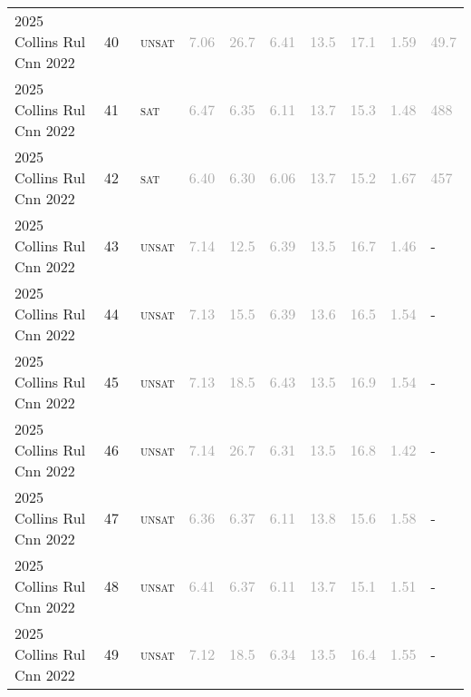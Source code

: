 \begin{center}
{\begin{longtable}{@{}llllllllll@{}}
2025 Collins Rul Cnn 2022 & 40 & ~\textsc{unsat} & \textcolor{darkgray}{7.06} & \textcolor{darkgray}{26.7} & \textcolor{darkgray}{6.41} & \textcolor{darkgray}{13.5} & \textcolor{darkgray}{17.1} & \textcolor{darkgray}{1.59} & \textcolor{darkgray}{49.7} \\
2025 Collins Rul Cnn 2022 & 41 & ~\textsc{sat} & \textcolor{darkgray}{6.47} & \textcolor{darkgray}{6.35} & \textcolor{darkgray}{6.11} & \textcolor{darkgray}{13.7} & \textcolor{darkgray}{15.3} & \textcolor{darkgray}{1.48} & \textcolor{darkgray}{488} \\
2025 Collins Rul Cnn 2022 & 42 & ~\textsc{sat} & \textcolor{darkgray}{6.40} & \textcolor{darkgray}{6.30} & \textcolor{darkgray}{6.06} & \textcolor{darkgray}{13.7} & \textcolor{darkgray}{15.2} & \textcolor{darkgray}{1.67} & \textcolor{darkgray}{457} \\
2025 Collins Rul Cnn 2022 & 43 & ~\textsc{unsat} & \textcolor{darkgray}{7.14} & \textcolor{darkgray}{12.5} & \textcolor{darkgray}{6.39} & \textcolor{darkgray}{13.5} & \textcolor{darkgray}{16.7} & \textcolor{darkgray}{1.46} & - \\
2025 Collins Rul Cnn 2022 & 44 & ~\textsc{unsat} & \textcolor{darkgray}{7.13} & \textcolor{darkgray}{15.5} & \textcolor{darkgray}{6.39} & \textcolor{darkgray}{13.6} & \textcolor{darkgray}{16.5} & \textcolor{darkgray}{1.54} & - \\
2025 Collins Rul Cnn 2022 & 45 & ~\textsc{unsat} & \textcolor{darkgray}{7.13} & \textcolor{darkgray}{18.5} & \textcolor{darkgray}{6.43} & \textcolor{darkgray}{13.5} & \textcolor{darkgray}{16.9} & \textcolor{darkgray}{1.54} & - \\
2025 Collins Rul Cnn 2022 & 46 & ~\textsc{unsat} & \textcolor{darkgray}{7.14} & \textcolor{darkgray}{26.7} & \textcolor{darkgray}{6.31} & \textcolor{darkgray}{13.5} & \textcolor{darkgray}{16.8} & \textcolor{darkgray}{1.42} & - \\
2025 Collins Rul Cnn 2022 & 47 & ~\textsc{unsat} & \textcolor{darkgray}{6.36} & \textcolor{darkgray}{6.37} & \textcolor{darkgray}{6.11} & \textcolor{darkgray}{13.8} & \textcolor{darkgray}{15.6} & \textcolor{darkgray}{1.58} & - \\
2025 Collins Rul Cnn 2022 & 48 & ~\textsc{unsat} & \textcolor{darkgray}{6.41} & \textcolor{darkgray}{6.37} & \textcolor{darkgray}{6.11} & \textcolor{darkgray}{13.7} & \textcolor{darkgray}{15.1} & \textcolor{darkgray}{1.51} & - \\
2025 Collins Rul Cnn 2022 & 49 & ~\textsc{unsat} & \textcolor{darkgray}{7.12} & \textcolor{darkgray}{18.5} & \textcolor{darkgray}{6.34} & \textcolor{darkgray}{13.5} & \textcolor{darkgray}{16.4} & \textcolor{darkgray}{1.55} & - \\

\end{longtable}}
\end{center}

